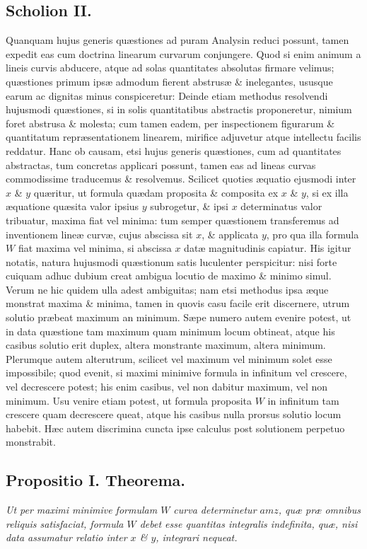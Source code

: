 \subsection*{Scholion II.}
Quanquam hujus generis quæstiones ad puram Analysin reduci possunt, tamen expedit eas cum doctrina linearum curvarum conjungere. Quod si enim animum a lineis curvis abducere, atque ad solas quantitates absolutas firmare velimus; quæstiones primum ipsæ admodum fierent abstrusæ \& inelegantes, ususque earum ac dignitas minus conspiceretur: Deinde etiam methodus resolvendi hujusmodi quæstiones, si in solis quantitatibus abstractis proponeretur, nimium foret abstrusa \& molesta; cum tamen eadem, per inspectionem figurarum \& quantitatum repræsentationem linearem, mirifice adjuvetur atque intellectu facilis reddatur. Hanc ob causam, etsi hujus generis quæstiones, cum ad quantitates abstractas, tum concretas applicari possunt, tamen eas ad lineas curvas commodissime traducemus \& resolvemus. Scilicet quoties æquatio ejusmodi inter $x$ \& $y$ quæritur, ut formula quædam proposita \& composita ex $x$ \& $y$, si ex illa æquatione quæsita valor ipsius $y$ subrogetur, \& ipsi $x$ determinatus valor tribuatur, maxima fiat vel minima: tum semper quæstionem transferemus ad inventionem lineæ curvæ, cujus abscissa sit $x$, \& applicata $y$, pro qua illa formula $W$ fiat maxima vel minima, si abscissa $x$ datæ magnitudinis capiatur. His igitur notatis, natura hujusmodi quæstionum satis luculenter perspicitur: nisi forte cuiquam adhuc dubium creat ambigua locutio de maximo \& minimo simul. Verum ne hic quidem ulla adest ambiguitas; nam etsi methodus ipsa æque monstrat maxima \& minima, tamen in quovis casu facile erit discernere, utrum solutio præbeat maximum an minimum. Sæpe numero autem evenire potest, ut in data quæstione tam maximum quam minimum locum obtineat, atque his casibus solutio erit duplex, altera monstrante maximum, altera minimum. Plerumque autem alterutrum, scilicet vel maximum vel minimum solet esse impossibile; quod evenit, si maximi minimive formula in infinitum vel crescere, vel decrescere potest; his enim casibus, vel non dabitur maximum, vel non minimum. Usu venire etiam potest, ut formula proposita $W$ in infinitum tam crescere quam decrescere queat, atque his casibus nulla prorsus solutio locum habebit. Hæc autem discrimina cuncta ipse calculus post solutionem perpetuo monstrabit.

\subsection*{Propositio I. Theorema.}
\textit{Ut per maximi minimive formulam $W$ curva determinetur $amz$, quæ præ omnibus reliquis satisfaciat, formula $W$ debet esse quantitas integralis indefinita, quæ, nisi data assumatur relatio inter $x$ \& $y$, integrari nequeat.}

